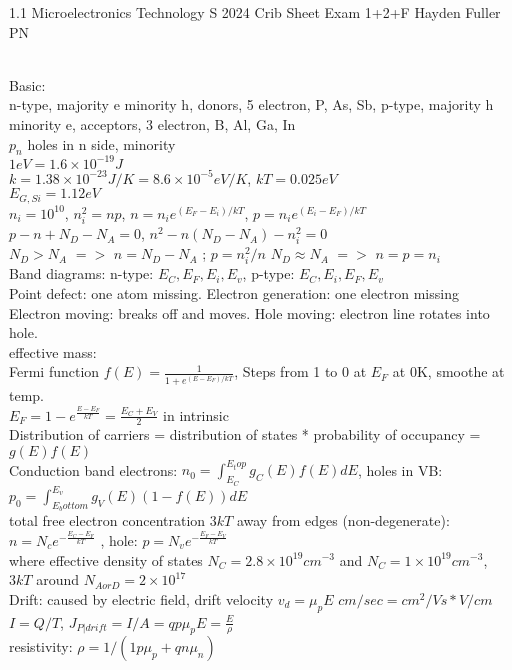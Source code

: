 \documentclass{article}
\begin{document}
1.1 Microelectronics Technology S 2024 Crib Sheet Exam 1+2+F Hayden Fuller PN
\begin{large}
\\Basic:
\\n-type, majority e minority h, donors, 5 electron, P, As, Sb,    p-type, majority h minority e, acceptors, 3 electron, B, Al, Ga, In
\\$p_n$ holes in n side, minority
\\$1eV=1.6\times10^{-19}J$
\\$k=1.38\times10^{-23}J/K=8.6\times10^{-5}eV/K$, $kT=0.025eV$
\\$E_{G,Si}=1.12eV$
\\$n_i=10^{10}$, $n_i^2=np$, $n=n_ie^{(E_F-E_i)/kT}$, $p=n_ie^{(E_i-E_F)/kT}$
\\$p-n+N_D-N_A=0$, $n^2-n(N_D-N_A)-n_i^2=0$
\\$N_D>N_A$ $= >$ $n=N_D-N_A$ ; $p=n_i^2/n$     $N_D\approx N_A$ $= >$ $n=p=n_i$
\\Band diagrams: n-type: $E_C, E_F, E_i, E_v$,   p-type: $E_C, E_i, E_F, E_v$
\\Point defect: one atom missing. Electron generation: one electron missing
\\Electron moving: breaks off and moves. Hole moving: electron line rotates into hole.
\\effective mass: 
\\Fermi function $f(E)=\frac{1}{1+e^{(E-E_F)/kT}}$, Steps from 1 to 0 at $E_F$ at 0K, smoothe at temp.
\\$E_F=1-e^{\frac{E-E_F}{kT}}=\frac{E_C+E_V}{2}$ in intrinsic
\\Distribution of carriers = distribution of states * probability of occupancy = $g(E) f(E)$
\\Conduction band electrons: $n_0=\int_{E_C}^{E_top} g_C(E)f(E)dE$, holes in VB: $p_0=\int_{E_bottom}^{E_v} g_V(E)(1-f(E))dE$
\\total free electron concentration $3kT$ away from edges (non-degenerate): $n=N_ce^{-\frac{E_C-E_F}{kT}}$ , hole: $p=N_ve^{-\frac{E_F-E_V}{kT}}$
\\where effective density of states $N_ C=2.8\times10^{19}cm^{-3}$ and $N_ C=1\times10^{19}cm^{-3}$, $3kT$ around $N_{A or D}=2\times10^{17}$
\\Drift:  caused by electric field, drift velocity $v_d=\mu_p E$  $cm/sec=cm^2/Vs * V/cm$
\\$I=Q/T$, $J_{P|drift}=I/A=qp\mu_pE=\frac{E}{\rho}$
\\resistivity: $\rho=1/(1p\mu_p+qn\mu_n)$

\end{large}
\end{document}

